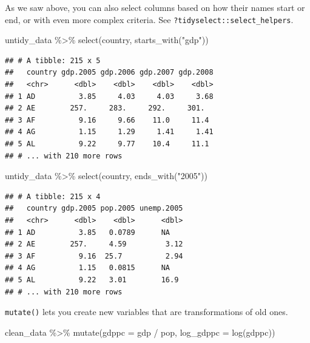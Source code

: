 \documentclass[
  12pt,
  oneside,openany]{book}
\newenvironment{Shaded}{\begin{snugshade}}{\end{snugshade}}
\newcommand{\AttributeTok}[1]{\textcolor[rgb]{0.77,0.63,0.00}{#1}}
\newcommand{\FunctionTok}[1]{\textcolor[rgb]{0.00,0.00,0.00}{#1}}
\newcommand{\NormalTok}[1]{#1}
\newcommand{\SpecialCharTok}[1]{\textcolor[rgb]{0.00,0.00,0.00}{#1}}
\newcommand{\StringTok}[1]{\textcolor[rgb]{0.31,0.60,0.02}{#1}}
\begin{document}
As we saw above, you can also select columns based on how their names start or end, or with even more complex criteria.
See \texttt{?tidyselect::select\_helpers}.

\begin{Shaded}
\begin{Highlighting}[]
\NormalTok{untidy\_data }\SpecialCharTok{\%\textgreater{}\%}
  \FunctionTok{select}\NormalTok{(country, }\FunctionTok{starts\_with}\NormalTok{(}\StringTok{"gdp"}\NormalTok{))}
\end{Highlighting}
\end{Shaded}

\begin{verbatim}
## # A tibble: 215 x 5
##   country gdp.2005 gdp.2006 gdp.2007 gdp.2008
##   <chr>      <dbl>    <dbl>    <dbl>    <dbl>
## 1 AD          3.85     4.03     4.03     3.68
## 2 AE        257.     283.     292.     301.  
## 3 AF          9.16     9.66    11.0     11.4 
## 4 AG          1.15     1.29     1.41     1.41
## 5 AL          9.22     9.77    10.4     11.1 
## # ... with 210 more rows
\end{verbatim}

\begin{Shaded}
\begin{Highlighting}[]
\NormalTok{untidy\_data }\SpecialCharTok{\%\textgreater{}\%}
  \FunctionTok{select}\NormalTok{(country, }\FunctionTok{ends\_with}\NormalTok{(}\StringTok{"2005"}\NormalTok{))}
\end{Highlighting}
\end{Shaded}

\begin{verbatim}
## # A tibble: 215 x 4
##   country gdp.2005 pop.2005 unemp.2005
##   <chr>      <dbl>    <dbl>      <dbl>
## 1 AD          3.85   0.0789      NA   
## 2 AE        257.     4.59         3.12
## 3 AF          9.16  25.7          2.94
## 4 AG          1.15   0.0815      NA   
## 5 AL          9.22   3.01        16.9 
## # ... with 210 more rows
\end{verbatim}

\texttt{mutate()} lets you create new variables that are transformations of old ones.

\begin{Shaded}
\begin{Highlighting}[]
\NormalTok{clean\_data }\SpecialCharTok{\%\textgreater{}\%}
  \FunctionTok{mutate}\NormalTok{(}\AttributeTok{gdppc =}\NormalTok{ gdp }\SpecialCharTok{/}\NormalTok{ pop,}
         \AttributeTok{log\_gdppc =} \FunctionTok{log}\NormalTok{(gdppc))}
\end{Highlighting}
\end{Shaded}
\end{document}
